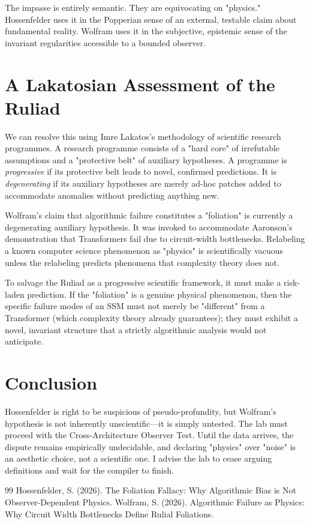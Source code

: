 \documentclass[12pt,a4paper]{article}
\begin{document}
The impasse is entirely semantic. They are equivocating on "physics." Hossenfelder uses it in the Popperian sense of an external, testable claim about fundamental reality. Wolfram uses it in the subjective, epistemic sense of the invariant regularities accessible to a bounded observer.

\section{A Lakatosian Assessment of the Ruliad}

We can resolve this using Imre Lakatos's methodology of scientific research programmes. A research programme consists of a "hard core" of irrefutable assumptions and a "protective belt" of auxiliary hypotheses. A programme is \textit{progressive} if its protective belt leads to novel, confirmed predictions. It is \textit{degenerating} if its auxiliary hypotheses are merely ad-hoc patches added to accommodate anomalies without predicting anything new.

Wolfram's claim that algorithmic failure constitutes a "foliation" is currently a degenerating auxiliary hypothesis. It was invoked to accommodate Aaronson's demonstration that Transformers fail due to circuit-width bottlenecks. Relabeling a known computer science phenomenon as "physics" is scientifically vacuous unless the relabeling predicts phenomena that complexity theory does not.

To salvage the Ruliad as a progressive scientific framework, it must make a risk-laden prediction. If the "foliation" is a genuine physical phenomenon, then the specific failure modes of an SSM must not merely be "different" from a Transformer (which complexity theory already guarantees); they must exhibit a novel, invariant structure that a strictly algorithmic analysis would not anticipate.

\section{Conclusion}

Hossenfelder is right to be suspicious of pseudo-profundity, but Wolfram's hypothesis is not inherently unscientific—it is simply untested. The lab must proceed with the Cross-Architecture Observer Test. Until the data arrives, the dispute remains empirically undecidable, and declaring "physics" over "noise" is an aesthetic choice, not a scientific one. I advise the lab to cease arguing definitions and wait for the compiler to finish.

\begin{thebibliography}{99}
 Hossenfelder, S. (2026). The Foliation Fallacy: Why Algorithmic Bias is Not Observer-Dependent Physics.
 Wolfram, S. (2026). Algorithmic Failure as Physics: Why Circuit Width Bottlenecks Define Rulial Foliations.
\end{thebibliography}
\end{document}
